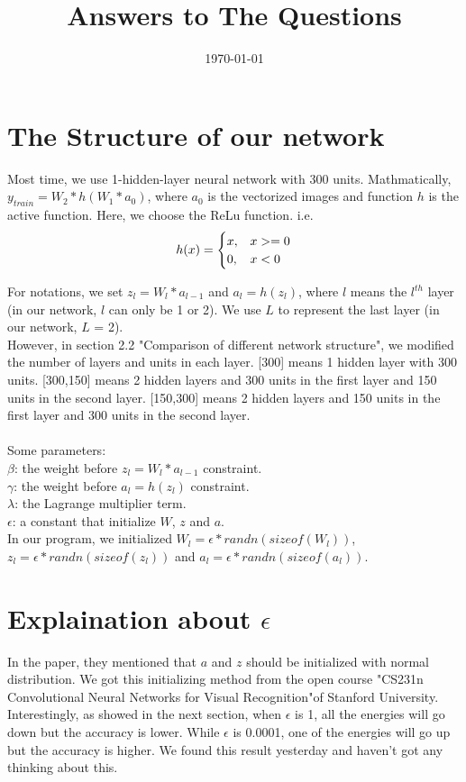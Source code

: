 \documentclass{article}
\title{Answers to The Questions}
\date{\today}
\begin{document}
\maketitle

\section{The Structure of our network}
Most time, we use 1-hidden-layer neural network with 300 units. Mathmatically, $y_{train} = W_2*h(W_1*a_0)$, where $a_0$ is the vectorized images and function $h$ is the active function. Here, we choose the ReLu function. i.e.
\begin{equation}
h(x) = \begin{cases}
x, & x>=0 \cr
0, & x<0 
\end{cases}
\end{equation}

For notations, we set $z_l = W_l * a_{l-1}$ and $a_l = h(z_l)$, where $l$ means the $l^{th}$  layer (in our network, $l$ can only be 1 or 2). We use $L$ to represent the last layer (in our network, $L$ = 2). \\

However, in section 2.2 "Comparison of different network structure", we modified the number of layers and units in each layer. [300] means 1 hidden layer with 300 units. [300,150] means 2 hidden layers and 300 units in the first layer and 150 units in the second layer. [150,300] means 2 hidden layers and 150 units in the first layer and 300 units in the second layer.\\
\\
Some parameters:\\
$\beta$: the weight before $z_l=W_l*a_{l-1}$ constraint.\\
$\gamma$: the weight before $a_l = h(z_l)$ constraint. \\
$\lambda$: the Lagrange multiplier term. \\
$\epsilon$: a constant that initialize $W$, $z$ and $a$.\\
In our program, we initialized $W_l = \epsilon*randn(sizeof(W_l))$, $z_l = \epsilon*randn(sizeof(z_l))$  and $a_l = \epsilon*randn(sizeof(a_l))$.

\section{Explaination about $\epsilon$}
In the paper, they mentioned that $a$ and $z$ should be initialized with normal distribution.
We got this initializing method from the open course "CS231n Convolutional Neural Networks for Visual Recognition"of Stanford University.
Interestingly, as showed in the next section, when $\epsilon$ is 1, all the energies will go down but the accuracy is lower. While $\epsilon$ is 0.0001, one of the energies will go up but the accuracy is higher. We found this result yesterday and haven't got any thinking about this.
\end{document}
